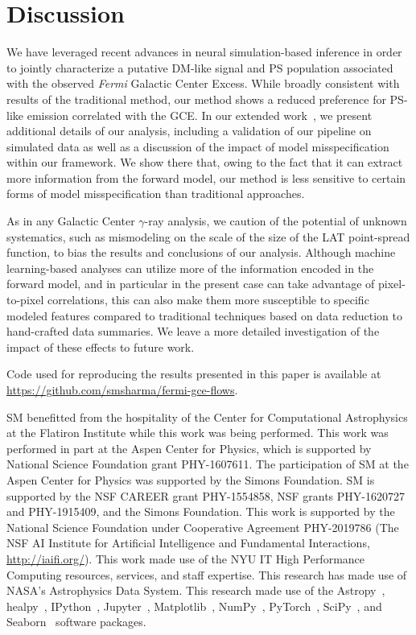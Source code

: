 \documentclass[]{article}
\newcommand{\Fermi}{\emph{Fermi}\xspace}
\begin{document}
\section{Discussion}
\label{sec:conclusions}

We have leveraged recent advances in neural simulation-based inference in order to jointly characterize a putative DM-like signal and PS population associated with the observed \Fermi Galactic Center Excess. While broadly consistent with results of the traditional method, our method shows a reduced preference for PS-like emission correlated with the GCE. In our extended work~\cite{Mishra-Sharma:InProgress}, we present additional details of our analysis, including a validation of our pipeline on simulated data as well as a discussion of the impact of model misspecification within our framework. We show there that, owing to the fact that it can extract more information from the forward model, our method is less sensitive to certain forms of model misspecification than traditional approaches.

As in any Galactic Center $\gamma$-ray analysis, we caution of the potential of unknown systematics, such as mismodeling on the scale of the size of the LAT point-spread function, to bias the results and conclusions of our analysis. Although machine learning-based analyses can utilize more of the information encoded in the forward model, and in particular in the present case can take advantage of pixel-to-pixel correlations, this can also make them more susceptible to specific modeled features compared to traditional techniques based on data reduction to hand-crafted data summaries. We leave a more detailed investigation of the impact of these effects to future work.

Code used for reproducing the results presented in this paper is available at \url{https://github.com/smsharma/fermi-gce-flows}. 

\begin{ack}
SM benefitted from the hospitality of the Center for Computational Astrophysics at the Flatiron Institute while this work was being performed. 
This work was performed in part at the Aspen Center for Physics, which is supported by National Science Foundation grant PHY-1607611.
The participation of SM at the Aspen Center for Physics was supported by the Simons Foundation.
SM is supported by the NSF CAREER grant PHY-1554858, NSF grants PHY-1620727 and PHY-1915409, and the Simons Foundation. 
This work is supported by the National Science Foundation under Cooperative Agreement PHY-2019786 (The NSF AI Institute for Artificial Intelligence and Fundamental Interactions, \url{http://iaifi.org/}).
This work made use of the NYU IT High Performance Computing resources, services, and staff expertise. 
This research has made use of NASA's Astrophysics Data System. 
This research made use of the Astropy~\cite{Robitaille:2013mpa,Price-Whelan:2018hus},
healpy~\cite{Gorski:2004by,Zonca2019},
IPython~\cite{PER-GRA:2007},
Jupyter~\cite{Kluyver2016JupyterN},
Matplotlib~\cite{Hunter:2007},
NumPy~\cite{harris_array_2020},
PyTorch~\cite{NEURIPS2019_9015},
SciPy~\cite{2020SciPy-NMeth}, and
Seaborn~\cite{michael_waskom_2017_883859}
software packages.
\end{ack}
\end{document}
